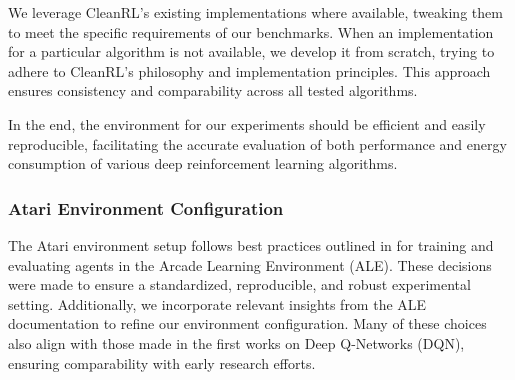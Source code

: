 We leverage CleanRL's existing implementations where available, tweaking them to meet the specific requirements of our benchmarks. When an implementation for a particular algorithm is not available, we develop it from scratch, trying to adhere to CleanRL's philosophy and implementation principles. This approach ensures consistency and comparability across all tested algorithms.

In the end, the environment for our experiments should be efficient and easily reproducible, facilitating the accurate evaluation of both performance and energy consumption of various deep reinforcement learning algorithms.


\subsubsection{Atari Environment Configuration}

The Atari environment setup follows best practices outlined in \cite{machado:revisiting_ale} for training and evaluating agents in the Arcade Learning Environment (ALE). These decisions were made to ensure a standardized, reproducible, and robust experimental setting. Additionally, we incorporate relevant insights from the ALE documentation to refine our environment configuration. Many of these choices also align with those made in the first works on Deep Q-Networks (DQN), ensuring comparability with early research efforts.

